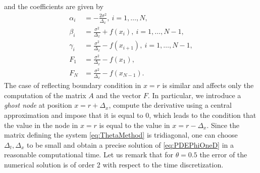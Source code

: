 and the coefficients are given by
\begin{equation}
\begin{split}
	\alpha_i &= -\frac{2\sigma^2}{\Delta_x}, \: i = 1, \dots, N, \\
	\beta_i  &= \frac{\sigma^2}{\Delta_x} + f(x_{i}), \: i = 1, \dots, N-1, \\
	\gamma_i &= \frac{\sigma^2}{\Delta_x} - f(x_{i+1}), \: i = 1, \dots, N-1, \\
	F_1      &= \frac{\sigma^2}{\Delta_x} - f(x_1), \\
	F_N      &= \frac{\sigma^2}{\Delta_x} - f(x_{N-1}).
\end{split}	
\end{equation}
The case of reflecting boundary condition in $x = r$ is similar and affects only the computation of the matrix $A$ and the vector $F$. In particular, we introduce a \textit{ghost node} at position $x = r + \Delta_x$, compute the derivative using a central approximation and impose that it is equal to 0, which leads to the condition that the value in the node in $x = r$ is equal to the value in $x = r - \Delta_x$. Since the matrix defining the system \eqref{eq:ThetaMethod} is tridiagonal, one can choose $\Delta_t, \Delta_x$ to be small and obtain a precise solution of \eqref{eq:PDEPhiOneD} in a reasonable computational time. Let us remark that for $\theta = 0.5$ the error of the numerical solution is of order 2 with respect to the time discretization.

 
